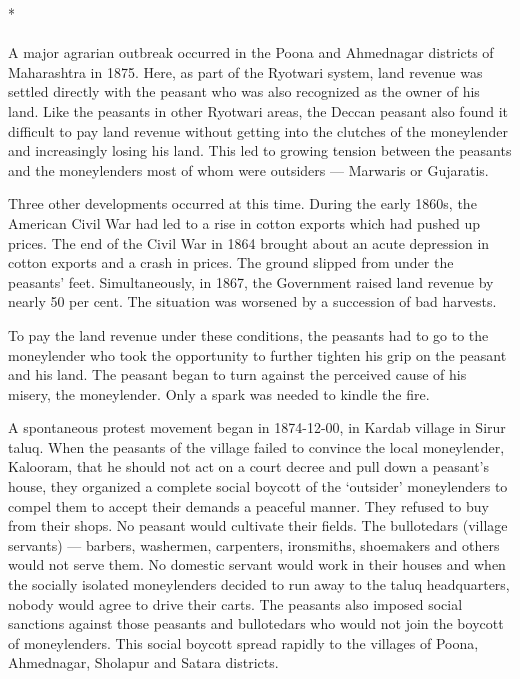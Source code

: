 \begin{multicols}{2}
\begin{center}*\end{center}

\paragraph*{}
A major agrarian outbreak occurred in the Poona and Ahmednagar districts of Maharashtra in 1875. Here, as part of the Ryotwari system, land revenue was settled directly with the peasant who was also recognized as the owner of his land. Like the peasants in other Ryotwari areas, the Deccan peasant also found it difficult to pay land revenue without getting into the clutches of the moneylender and increasingly losing his land. This led to growing tension between the peasants and the moneylenders most of whom were outsiders --- Marwaris or Gujaratis.

Three other developments occurred at this time. During the early 1860s, the American Civil War had led to a rise in cotton exports which had pushed up prices. The end of the Civil War in 1864 brought about an acute depression in cotton exports and a crash in prices. The ground slipped from under the peasants' feet. Simultaneously, in 1867, the Government raised land revenue by nearly 50 per cent. The situation was worsened by a succession of bad harvests.

To pay the land revenue under these conditions, the peasants had to go to the moneylender who took the opportunity to further tighten his grip on the peasant and his land. The peasant began to turn against the perceived cause of his misery, the moneylender. Only a spark was needed to kindle the fire.

A spontaneous protest movement began in 1874-12-00, in Kardab village in Sirur taluq. When the peasants of the village failed to convince the local moneylender, Kalooram, that he should not act on a court decree and pull down a peasant's house, they organized a complete social boycott of the `outsider' moneylenders to compel them to accept their demands a peaceful manner. They refused to buy from their shops. No peasant would cultivate their fields. The bullotedars (village servants) --- barbers, washermen, carpenters, ironsmiths, shoemakers and others would not serve them. No domestic servant would work in their houses and when the socially isolated moneylenders decided to run away to the taluq headquarters, nobody would agree to drive their carts. The peasants also imposed social sanctions against those peasants and bullotedars who would not join the boycott of moneylenders. This social boycott spread rapidly to the villages of Poona, Ahmednagar, Sholapur and Satara districts.


\end{multicols}
